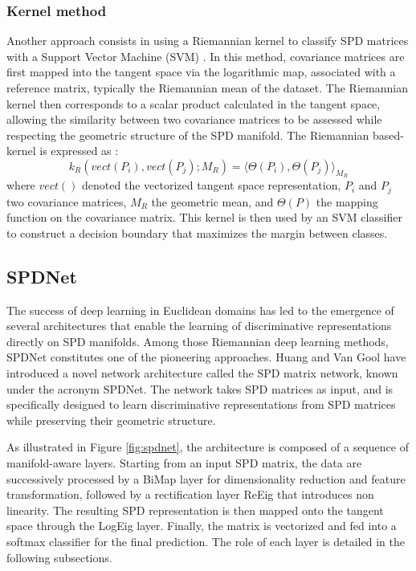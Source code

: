\documentclass[11pt,a4paper]{article}
\begin{document}
\subsubsection{Kernel method}
Another approach consists in using a Riemannian kernel to classify SPD matrices with a Support Vector Machine (SVM) \cite{kernelSVM}.
In this method, covariance matrices are first mapped into the tangent space via the logarithmic map, associated with a reference matrix, typically the Riemannian mean of the dataset. 
The Riemannian kernel then corresponds to a scalar product calculated in the tangent space, allowing the similarity between two covariance matrices to be assessed while respecting the geometric structure of the SPD manifold. 
The Riemannian based-kernel is expressed as : \[ k_R (vect(P_i), vect(P_j); M_R) = \langle \Theta(P_i), \Theta(P_j)\rangle_{M_R}\] where $vect()$ denoted the vectorized tangent space representation, $P_i$ and $P_j$ two covariance matrices, $M_R$ the geometric mean, and $\Theta(P)$ the mapping function on the covariance matrix. 
\noindent This kernel is then used by an SVM classifier to construct a decision boundary that maximizes the margin between classes. 
\newline



\subsection{SPDNet}
The success of deep learning in Euclidean domains has led to the emergence of several architectures that enable the learning of discriminative representations directly on SPD manifolds. Among those Riemannian deep learning methods, SPDNet constitutes one of the pioneering approaches.
Huang and Van Gool \cite{spdnet} have introduced a novel network architecture called the SPD matrix network, known under the acronym SPDNet. The network takes SPD matrices as input, and is specifically designed to learn discriminative representations from SPD matrices while preserving their geometric structure.

As illustrated in Figure \ref{fig:spdnet}, the architecture is composed of a sequence of manifold-aware layers. Starting from an input SPD matrix, the data are successively processed by a BiMap layer for dimensionality reduction and feature transformation, followed by a rectification layer ReEig that introduces non linearity. The resulting SPD representation is then mapped onto the tangent space through the LogEig layer. Finally, the matrix is vectorized and fed into a softmax classifier for the final prediction. The role of each layer is detailed in the following subsections. 
\end{document}
